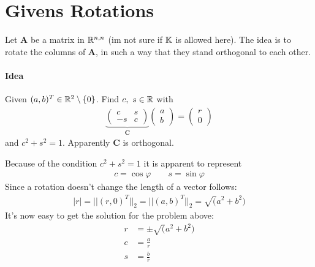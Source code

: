 	\section{Givens Rotations}
		Let $\mathbf A$ be a matrix in $\mathbb{R}^{n,n}$ (im not sure if $\mathbb{K}$ is allowed here). The idea is to rotate the columns of $\mathbf A$, in such a way that they stand orthogonal to each other.

		\paragraph{Idea} Given $(a,b)^T \in \mathbb{R}^2 \setminus \{0\}$. Find $c,\ s \in \mathbb{R}$ with
			\begin{align*}
			 \underbrace{
				\begin{pmatrix}
					c & s\\
					-s&c 
				\end{pmatrix}}_{\mathbf C}
					\begin{pmatrix}
						a\\
						b
					\end{pmatrix} = \begin{pmatrix}
										r\\
										0
									\end{pmatrix}
			\end{align*}
			and $c^2+s^2 = 1$. Apparently $\mathbf C$ is orthogonal.

			Because of the condition $c^2+s^2 = 1$ it is apparent to represent
			\begin{align*}
				c = \cos \varphi \qquad s = \sin \varphi
			\end{align*}
			Since a rotation doesn't change the length of a vector follows:
			\begin{align*}
				|r| = ||(r,0)^T||_2 = ||(a,b)^T||_2 = \sqrt(a^2+b^2)
			\end{align*}
			It's now easy to get the solution for the problem above:
			\begin{align*}
				r &= \pm \sqrt(a^2+b^2)\\
				c &= \frac{a}{r}\\
				s &= \frac{b}{r}
			\end{align*}

